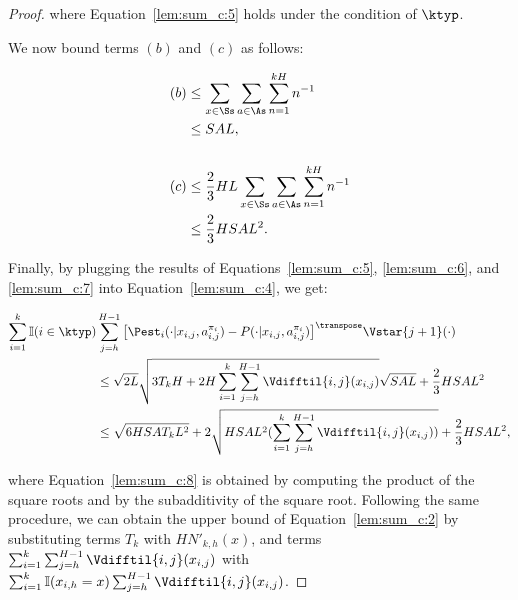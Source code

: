 \begin{proof}
where Equation~\eqref{lem:sum_c:5} holds under the condition of $\ktyp$.

We now bound terms $(b)$ and $(c)$ as follows:

\begin{align}
    (b) &\le \sum_{x \in \Ss} \sum_{a \in \As} \sum_{n=1}^{kH} n^{-1} \nonumber \\
    &\le SAL, \label{lem:sum_c:6} \\
    & \nonumber \\
    (c) &\le \frac{2}{3} HL \sum_{x \in \Ss} \sum_{a \in \As} \sum_{n=1}^{kH} n^{-1} \nonumber \\
    &\le \frac{2}{3} HSAL^2. \label{lem:sum_c:7}
\end{align}

Finally, by plugging the results of Equations~\eqref{lem:sum_c:5}, \eqref{lem:sum_c:6}, and \eqref{lem:sum_c:7} into Equation~\eqref{lem:sum_c:4}, we get:

\begin{align}
    \sum_{i=1}^k \mathbb{I}(i \in \ktyp) &\sum_{j=h}^{H-1} \big[ \Pest_i(\cdot | x_{i,j}, a_{i,j}^{\pi_i}) - P(\cdot | x_{i,j}, a_{i,j}^{\pi_i}) \big]^\transpose \Vstar{j+1}(\cdot) \nonumber \\
    &\le \sqrt{2L}\sqrt{3 T_k H + 2 H \sum_{i=1}^k \sum_{j=h}^{H-1} \Vdifftil{i,j}(x_{i,j})}\sqrt{SAL} + \frac{2}{3} HSAL^2 \nonumber \\
    &\le \sqrt{6 H S A T_k L^2} + 2\sqrt{H S A L^2 (\sum_{i=1}^k \sum_{j=h}^{H-1} \Vdifftil{i,j}(x_{i,j}))} + \frac{2}{3} HSAL^2, \label{lem:sum_c:8}
\end{align}

where Equation~\eqref{lem:sum_c:8} is obtained by computing the product of the square roots and by the subadditivity of the square root.
Following the same procedure, we can obtain the upper bound of Equation~\eqref{lem:sum_c:2} by substituting terms $T_k$ with $H N'_{k,h}(x)$, and terms $\sum_{i=1}^k \sum_{j=h}^{H-1} \Vdifftil{i,j}(x_{i,j})$ with $\sum_{i=1}^k \mathbb{I}(x_{i,h}=x) \sum_{j=h}^{H-1} \Vdifftil{i,j}(x_{i,j})$.
\end{proof}


